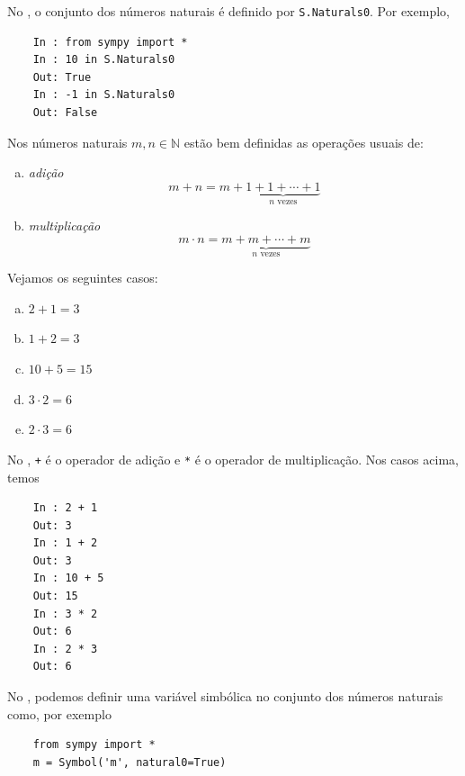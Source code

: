 \ifispython
\begin{obs}
  No \python, o conjunto dos números naturais é definido por \lstinline!S.Naturals0!. Por exemplo,
  \begin{lstlisting}
    In : from sympy import *
    In : 10 in S.Naturals0
    Out: True
    In : -1 in S.Naturals0
    Out: False
  \end{lstlisting}
\end{obs}
\fi

Nos números naturais $m,n\in\mathbb{N}$ estão bem definidas as operações usuais de:
\begin{enumerate}[a)]
\item \emph{adição}
  \begin{equation}
    m+n = m + \underbrace{1 + 1 + \cdots + 1}_{n\text{ vezes}}
  \end{equation}
\item \emph{multiplicação}
  \begin{equation}
    m\cdot n = \underbrace{m + m + \cdots + m}_{n\text{ vezes}}
  \end{equation}
\end{enumerate}

\begin{ex}
  Vejamos os seguintes casos:
  \begin{enumerate}[a)]
  \item $2 + 1 = 3$
  \item $1 + 2 = 3$
  \item $10 + 5 = 15$
  \item $3\cdot 2 = 6$
  \item $2\cdot 3 = 6$
  \end{enumerate}

  \ifispython
  No \python, \lstinline!+! é o operador de adição e \lstinline!*! é o operador de multiplicação. Nos casos acima, temos
  \begin{lstlisting}
    In : 2 + 1
    Out: 3
    In : 1 + 2
    Out: 3
    In : 10 + 5
    Out: 15
    In : 3 * 2
    Out: 6
    In : 2 * 3
    Out: 6
  \end{lstlisting}
  \fi
\end{ex}

\ifispython
\begin{obs}
  No \python, podemos definir uma variável simbólica no conjunto dos números naturais como, por exemplo
  \begin{lstlisting}
    from sympy import *
    m = Symbol('m', natural0=True)
  \end{lstlisting}
\end{obs}
\fi

